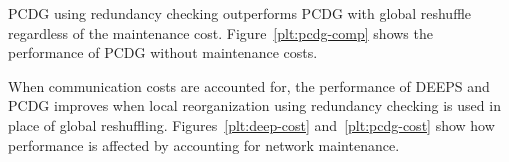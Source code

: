 \documentclass[technote, 10pt, letter]{IEEEtran}
\begin{document}
PCDG using redundancy checking outperforms PCDG with global reshuffle regardless of the maintenance cost. Figure~\ref{plt:pcdg-comp} shows the performance of PCDG without maintenance costs.


When communication costs are accounted for, the performance of DEEPS and PCDG improves when local reorganization using redundancy checking is used in place of global reshuffling. Figures~\ref{plt:deep-cost} and~\ref{plt:pcdg-cost} show how performance is affected by accounting for network maintenance.



\end{document}
